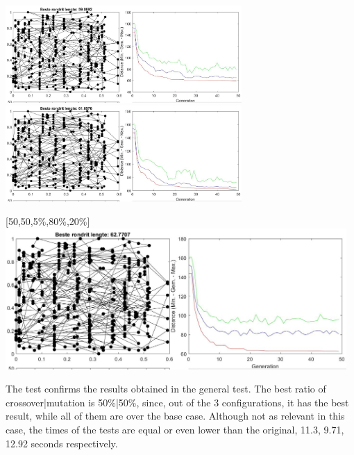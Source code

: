 \text{\big[50,50,5\%,50\%,50\%\big]}
\hfill
\text{\big[50,50,5,5\%,80\%,20\%\big]} \\
\includegraphics[width=9cm]{img/specific/xalt_edges/general_6.jpg}
\hfill
\includegraphics[width=9cm]{img/specific/xalt_edges/general_7.jpg}

\begin{center}
[50,50,5\%,80\%,20\%] \\
\includegraphics[width=13cm]{img/specific/xalt_edges/general_8.jpg}
\end{center}

The test confirms the results obtained in the general test. The best ratio of
crossover|mutation is 50\%|50\%, since, out of the 3 configurations, it has the
best result, while all of them are over the base case. Although not as relevant
in this case, the times of the tests are equal or even lower than the original, 11.3,
9.71, 12.92 seconds respectively. \\

